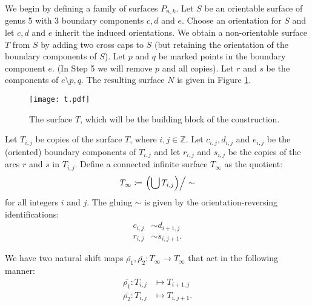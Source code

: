 

We begin by defining a family of surfaces $P_{n,k}$. Let $S$ be an orientable surface of genus 5 with 3
boundary components $c,d$ and $e$. Choose an orientation for $S$ and let $c,d$ and $e$ inherit the induced orientations. We obtain a non-orientable surface $T$ from $S$ by adding two cross caps to $S$ (but retaining the orientation of the boundary components of $S$). Let $p$ and $q$ be marked points in the boundary component $e$. (In Step 5 we will remove $p$ and all copies).  Let  $r$ and
$s$ be the components of $e\setminus{p,q}$. The resulting surface $N$ is given in Figure \ref{fig:buildingblock}.

\begin{figure}[ht]
    \centering
    \texttt{[image: t.pdf]}
    \caption{The surface $T$, which will be the building block of the construction.}
    \label{fig:buildingblock}
\end{figure}

Let $T_{i,j}$ be copies of the surface $T$, where $i,j \in \mathbb{Z}$. Let $c_{i,j}, d_{i,j}$ and $e_{i,j}$ be the (oriented) boundary components of $T_{i,j}$ and let $r_{i,j}$ and $s_{i,j}$ be the copies of the arcs $r$ and $s$ in $T_{i,j}$. Define a connected infinite surface $T_\infty$ as the quotient:
\begin{align*}
  T_\infty \coloneqq \left. \left( \bigcup T_{i,j} \right)\right/\sim
\end{align*}
for all integers $i$ and $j$. The gluing $\sim$ is given by the orientation-reversing identifications:
\begin{align}
\label{identification}
  c_{i,j} &\sim d_{i+1,j} \\
  r_{i,j} &\sim s_{i,j+1}.
\end{align}


We have two
natural shift maps $\overline{\rho_1},\overline{\rho_2}: T_\infty \to T_\infty$ that act in the
following manner:
\begin{align*}
  \overline{\rho_1}: T_{i,j} &\mapsto T_{i+1, j} \\
  \overline{\rho_2}: T_{i,j} &\mapsto T_{i, j+1}.
\end{align*}

